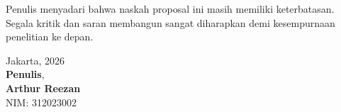 \documentclass[12pt,a4paper]{article}
\numberwithin{equation}{section}
\numberwithin{table}{section}
\numberwithin{figure}{section}
\newcommand{\namamahasiswa}{Arthur Reezan}
\newcommand{\nim}{312023002}
\begin{document}
\begin{singlespace}
Penulis menyadari bahwa naskah proposal ini masih memiliki keterbatasan. Segala kritik dan saran membangun sangat diharapkan demi kesempurnaan penelitian ke depan.

\vspace{0.25cm}
\noindent
\hfill
\begin{minipage}[t]{5.5cm}
  Jakarta, \underline{\hspace{3.2cm}} 2026\\[0.15cm]
  \textbf{Penulis},\\[1.2cm]
  \textbf{\namamahasiswa}\\
  NIM: \nim
\end{minipage}
\end{singlespace}

\newpage
\thispagestyle{frontmatter}
{}
\end{document}
